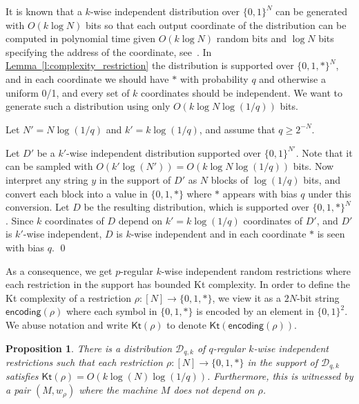 \documentclass[11pt]{article}
\numberwithin{equation}{section}
\newtheorem{proposition}[theorem]{Proposition}
\theoremstyle{definition}
\theoremstyle{plain}
\newcommand{\expref}[2]{\hyperref[#2]{#1~\ref{#2}}}
\newcommand{\Kt}{\mathsf{Kt}}
\begin{document}
 It is known that a $k$-wise independent distribution over $\{0,1\}^N$ can be generated with $O(k\log N)$ bits so that each output coordinate of the distribution can be computed in polynomial time given $O(k\log N)$ random bits and $\log N$ bits specifying the address of the coordinate, see~\cite{DBLP:conf/stoc/CarterW77}. In \expref{Lemma}{l:complexity_restriction} the distribution is supported over $\{0,1,*\}^N$, and in each coordinate we should have $*$ with probability $q$ and otherwise a uniform 0/1, and every set of $k$ coordinates should be independent. We want to generate such a distribution using only $O(k \log N \log (1/q))$ bits.

Let $N' = N \log (1/q)$ and $k' = k \log (1/q)$, and assume that $q\geq 2^{-N}$.

Let $D'$ be a $k'$-wise independent distribution supported over $\{0,1\}^{N'}$. Note that it can be sampled with $O(k'\log (N')) = O(k \log N \log(1/q))$ bits. Now interpret any string $y$ in the support of $D'$ as $N$ blocks of $\log(1/q)$ bits, and convert each block into a value in $\{0,1,*\}$ where $*$ appears with bias $q$ under this conversion. Let $D$ be the resulting distribution, which is supported over $\{0,1,*\}^N$. Since $k$ coordinates of $D$ depend on $k' = k \log(1/q)$ coordinates of $D'$, and $D'$ is $k'$-wise independent, $D$ is $k$-wise independent and in each coordinate $*$ is seen with bias $q$.  
\qed

\medskip
As a consequence, we get $p$-regular $k$-wise independent random restrictions where each restriction in the support has bounded Kt complexity. In order to define the Kt complexity of a restriction $\rho \colon [N] \to \{0,1,*\}$, we view it as a $2N$-bit string $\mathsf{encoding}(\rho)$ where each symbol in $\{0,1,*\}$ is encoded by an element in $\{0,1\}^2$. We abuse notation and write $\Kt(\rho)$ to denote $\Kt(\mathsf{encoding}(\rho))$.

\begin{proposition}\label{p:restriction_kt}
There is a distribution $\mathcal{D}_{q,k}$ of $q$-regular $k$-wise independent restrictions such that each restriction $\rho \colon [N] \to \{0,1,*\}$ in the support of $\mathcal{D}_{q,k}$ satisfies $\Kt(\rho) = O(k \log (N) \log (1/q))$. Furthermore, this is witnessed by a pair $(M,w_\rho)$ where the machine $M$ does not depend on $\rho$.  
\end{proposition}
\end{document}
